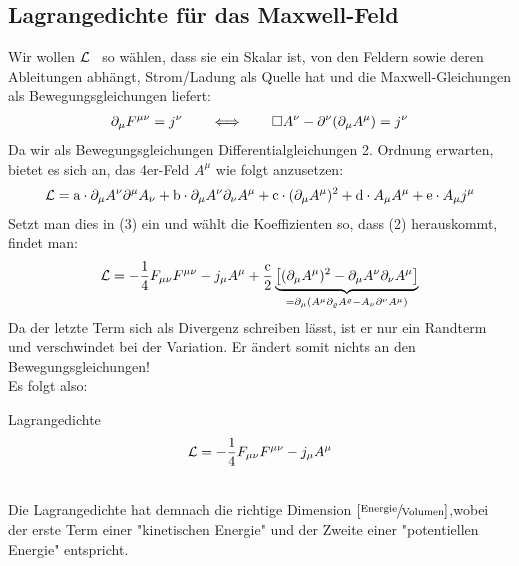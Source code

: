 \subsection{Lagrangedichte für das Maxwell-Feld}
Wir wollen $\mathcal{L}$ \ so wählen, dass sie ein Skalar ist, von den Feldern sowie deren Ableitungen abhängt, Strom/Ladung als Quelle hat und die Maxwell-Gleichungen als Bewegungsgleichungen liefert:
\begin{align}
\partial_{\mu}F^{\mu \nu} = j^{\nu} \qquad  \Longleftrightarrow \qquad \Box A^{\nu} - \partial^{\nu}(\partial_{\mu}A^{\mu}) = j^{\nu}
\end{align}
Da wir als Bewegungsgleichungen Differentialgleichungen 2. Ordnung erwarten, bietet es sich an, das 4er-Feld $A^{\mu}$ wie folgt anzusetzen:
\begin{align}
\mathcal{L} = \text{a} \cdot \partial_{\mu}A^{\nu}\partial^{\mu}A_{\nu} + \text{b} \cdot \partial_{\mu}A^{\nu}\partial_{\nu}A^{\mu} + \text{c} \cdot (\partial_{\mu}A^{\mu})^2 + \text{d} \cdot A_{\mu}A^{\mu} + \text{e} \cdot A_{\mu}j^{\mu}
\end{align}
Setzt man dies in (3) ein und wählt die Koeffizienten so, dass (2) herauskommt, findet man:
\begin{align}
\mathcal{L} = -\frac{1}{4} F_{\mu \nu} F^{\mu \nu} - j_{\mu}A^{\mu} + \frac{\text{c}}{2} \underbrace{\left[ (\partial_{\mu}A^{\mu})^2 - \partial_{\mu}A^{\nu}\partial_{\nu}A^{\mu} \right]}_{= \partial_{\mu}(A^{\mu}\partial_{\varrho}A^{\varrho}-A_{\nu}\partial^{\nu}A^{\mu})}
\end{align}
Da der letzte Term sich als Divergenz schreiben lässt, ist er nur ein Randterm und verschwindet bei der Variation. Er ändert somit nichts an den Bewegungsgleichungen! \\ 
Es folgt also:
\begin{mybox}{Lagrangedichte}
\begin{align}
\mathcal{L} = -\frac{1}{4} F_{\mu \nu} F^{\mu \nu} - j_{\mu}A^{\mu}
\end{align}
\end{mybox}
\phantom{.} \\
Die Lagrangedichte hat demnach die richtige Dimension $\left[\sfrac{\text{Energie}}{\text{Volumen}}\right]$,wobei der erste Term einer "kinetischen Energie" und der Zweite einer "potentiellen Energie" entspricht. \\

